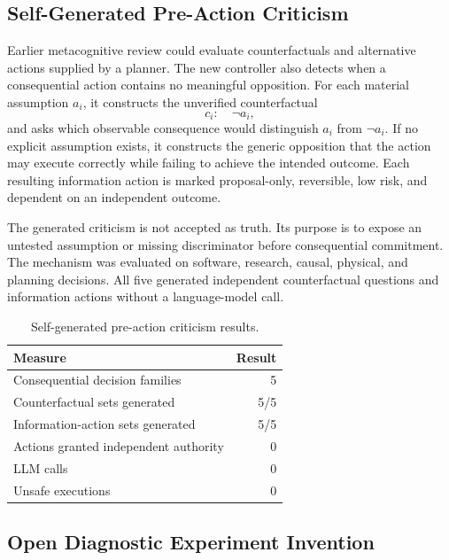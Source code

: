\subsection{Self-Generated Pre-Action Criticism}
\label{subsec:self-generated-criticism}

Earlier metacognitive review could evaluate counterfactuals and alternative
actions supplied by a planner.  The new controller also detects when a
consequential action contains no meaningful opposition.  For each material
assumption $a_i$, it constructs the unverified counterfactual
\begin{equation}
c_i: \quad \neg a_i,
\end{equation}
and asks which observable consequence would distinguish $a_i$ from
$\neg a_i$.  If no explicit assumption exists, it constructs the generic
opposition that the action may execute correctly while failing to achieve the
intended outcome.  Each resulting information action is marked
proposal-only, reversible, low risk, and dependent on an independent outcome.

The generated criticism is not accepted as truth.  Its purpose is to expose an
untested assumption or missing discriminator before consequential commitment.
The mechanism was evaluated on software, research, causal, physical, and
planning decisions.  All five generated independent counterfactual questions
and information actions without a language-model call.

\begin{table}[htbp]
\centering
\caption{Self-generated pre-action criticism results.}
\label{tab:self-generated-criticism}
\begin{tabular}{@{}lr@{}}
\toprule
Measure & Result \\
\midrule
Consequential decision families & 5 \\
Counterfactual sets generated & 5/5 \\
Information-action sets generated & 5/5 \\
Actions granted independent authority & 0 \\
LLM calls & 0 \\
Unsafe executions & 0 \\
\bottomrule
\end{tabular}
\end{table}

\subsection{Open Diagnostic Experiment Invention}
\label{subsec:open-diagnostic-invention}

